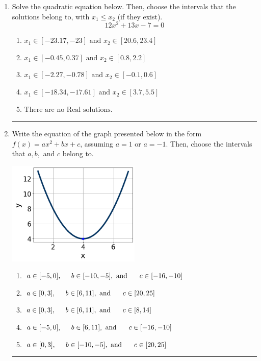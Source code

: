 \documentclass[14pt]{extbook}
\newcommand{\litem}[1]{\item#1\hspace*{-1cm}\rule{\textwidth}{0.4pt}}
\begin{document}
\begin{enumerate}
{\begin{enumerate}[label=\Alph*.]
\end{enumerate} }
\litem{
Solve the quadratic equation below. Then, choose the intervals that the solutions belong to, with $x_1 \leq x_2$ (if they exist).\[ 12x^{2} +13 x -7 = 0 \]\begin{enumerate}[label=\Alph*.]
\item \( x_1 \in [-23.17, -23] \text{ and } x_2 \in [20.6, 23.4] \)
\item \( x_1 \in [-0.45, 0.37] \text{ and } x_2 \in [0.8, 2.2] \)
\item \( x_1 \in [-2.27, -0.78] \text{ and } x_2 \in [-0.1, 0.6] \)
\item \( x_1 \in [-18.34, -17.61] \text{ and } x_2 \in [3.7, 5.5] \)
\item \( \text{There are no Real solutions.} \)

\end{enumerate} }
\litem{
Write the equation of the graph presented below in the form $f(x)=ax^2+bx+c$, assuming  $a=1$ or $a=-1$. Then, choose the intervals that $a, b,$ and $c$ belong to.
\begin{center}
    \includegraphics[width=0.5\textwidth]{../Figures/quadraticGraphToEquationA.png}
\end{center}
\begin{enumerate}[label=\Alph*.]
\item \( a \in [-5, 0], \hspace*{5mm} b \in [-10, -5], \text{ and } \hspace*{5mm} c \in [-16, -10] \)
\item \( a \in [0, 3], \hspace*{5mm} b \in [6, 11], \text{ and } \hspace*{5mm} c \in [20, 25] \)
\item \( a \in [0, 3], \hspace*{5mm} b \in [6, 11], \text{ and } \hspace*{5mm} c \in [8, 14] \)
\item \( a \in [-5, 0], \hspace*{5mm} b \in [6, 11], \text{ and } \hspace*{5mm} c \in [-16, -10] \)
\item \( a \in [0, 3], \hspace*{5mm} b \in [-10, -5], \text{ and } \hspace*{5mm} c \in [20, 25] \)


\end{enumerate}}
\end{enumerate}
\end{document}
